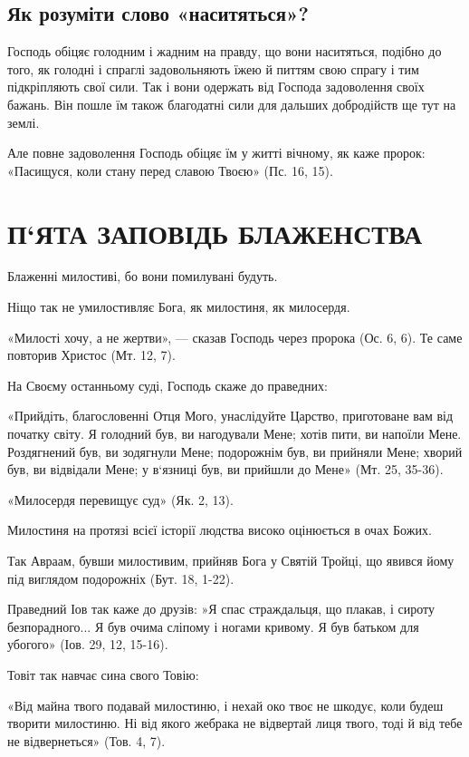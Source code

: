 \documentclass[main.tex]{subfiles}
\begin{document}
\subsection{Як розуміти слово «наситяться»?}

Господь обіцяє голодним і жадним на правду, що вони наситяться, подібно до того, як голодні і спраглі задовольняють їжею й питтям свою спрагу і тим підкріпляють свої сили. Так і вони одержать від Господа задоволення своїх бажань. Він пошле їм також благодатні сили для дальших добродійств ще тут на землі.

Але повне задоволення Господь обіцяє їм у житті вічному, як каже пророк: «Пасищуся, коли стану перед славою Твоєю» (Пс. 16, 15).

\section{П`ЯТА ЗАПОВІДЬ БЛАЖЕНСТВА}

Блаженні милостиві, бо вони помилувані будуть.

Ніщо так не умилостивляє Бога, як милостиня, як милосердя.

«Милості хочу, а не жертви», — сказав Господь через пророка (Ос. 6, 6). Те саме повторив Христос (Мт. 12, 7).

На Своєму останньому суді, Господь скаже до праведних:

«Прийдіть, благословенні Отця Мого, унаслідуйте Царство, приготоване вам від початку світу. Я голодний був, ви нагодували Мене; хотів пити, ви напоїли Мене. Роздягнений був, ви зодягнули Мене; подорожнім був, ви прийняли Мене; хворий був, ви відвідали Мене; у в`язниці був, ви прийшли до Мене» (Мт. 25, 35-36).

«Милосердя перевищує суд» (Як. 2, 13).

Милостиня на протязі всієї історії людства високо оцінюється в очах Божих.

Так Авраам, бувши милостивим, прийняв Бога у Святій Тройці, що явився йому під виглядом подорожніх (Бут. 18, 1-22).

Праведний Іов так каже до друзів: »Я спас страждальця, що плакав, і сироту безпорадного... Я був очима сліпому і ногами кривому. Я був батьком для убогого» (Іов. 29, 12, 15-16).

Товіт так навчає сина свого Товію:

«Від майна твого подавай милостиню, і нехай око твоє не шкодує, коли будеш творити милостиню. Ні від якого жебрака не відвертай лиця твого, тоді й від тебе не відвернеться» (Тов. 4, 7).
\end{document}
